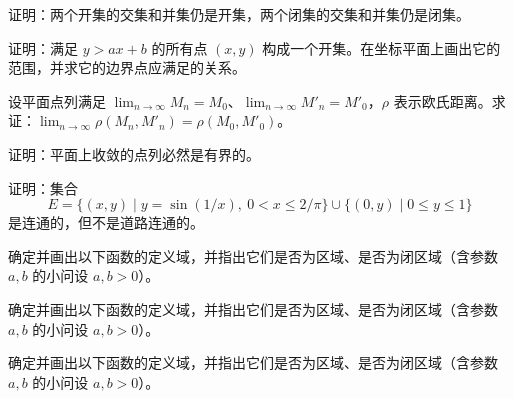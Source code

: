 \newpage
\noindent\begin{minipage}{\textwidth}
证明：两个开集的交集和并集仍是开集，两个闭集的交集和并集仍是闭集。
\end{minipage}\par\vfill
\noindent\begin{minipage}{\textwidth}
证明：满足 $y>ax+b$ 的所有点 $(x,y)$ 构成一个开集。在坐标平面上画出它的范围，并求它的边界点应满足的关系。
\end{minipage}\par\vfill
\noindent\begin{minipage}{\textwidth}
设平面点列满足 $\lim_{n\to\infty}M_n=M_0$、$\lim_{n\to\infty}M'_n=M'_0$，$\rho$ 表示欧氏距离。求证：$\lim_{n\to\infty}\rho(M_n,M'_n)=\rho(M_0,M'_0)$。
\end{minipage}\par\vfill
\noindent\begin{minipage}{\textwidth}
证明：平面上收敛的点列必然是有界的。
\end{minipage}\par\vfill
\newpage
\noindent\begin{minipage}{\textwidth}
证明：集合 \[E=\{(x,y)\mid y=\sin(1/x),\ 0<x\le2/\pi\}\cup\{(0,y)\mid0\le y\le1\}\] 是连通的，但不是道路连通的。
\end{minipage}\par\vfill
\noindent\begin{minipage}{\textwidth}
确定并画出以下函数的定义域，并指出它们是否为区域、是否为闭区域（含参数 $a,b$ 的小问设 $a,b>0$）。
\end{minipage}\par\vfill
\noindent\begin{minipage}{\textwidth}
确定并画出以下函数的定义域，并指出它们是否为区域、是否为闭区域（含参数 $a,b$ 的小问设 $a,b>0$）。
\end{minipage}\par\vfill
\noindent\begin{minipage}{\textwidth}
确定并画出以下函数的定义域，并指出它们是否为区域、是否为闭区域（含参数 $a,b$ 的小问设 $a,b>0$）。
\end{minipage}\par\vfill
